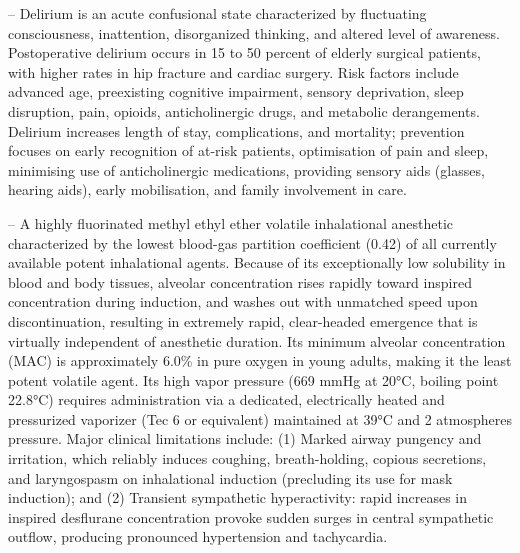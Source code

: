 -- Delirium is an acute confusional state characterized by fluctuating consciousness, inattention, disorganized thinking, and altered level of awareness. Postoperative delirium occurs in 15 to 50 percent of elderly surgical patients, with higher rates in hip fracture and cardiac surgery. Risk factors include advanced age, preexisting cognitive impairment, sensory deprivation, sleep disruption, pain, opioids, anticholinergic drugs, and metabolic derangements. Delirium increases length of stay, complications, and mortality; prevention focuses on early recognition of at-risk patients, optimisation of pain and sleep, minimising use of anticholinergic medications, providing sensory aids (glasses, hearing aids), early mobilisation, and family involvement in care.

-- A highly fluorinated methyl ethyl ether volatile inhalational anesthetic characterized by the lowest blood-gas partition coefficient (0.42) of all currently available potent inhalational agents. Because of its exceptionally low solubility in blood and body tissues, alveolar concentration rises rapidly toward inspired concentration during induction, and washes out with unmatched speed upon discontinuation, resulting in extremely rapid, clear-headed emergence that is virtually independent of anesthetic duration. Its minimum alveolar concentration (MAC) is approximately 6.0\% in pure oxygen in young adults, making it the least potent volatile agent. Its high vapor pressure (669 mmHg at 20°C, boiling point 22.8°C) requires administration via a dedicated, electrically heated and pressurized vaporizer (Tec 6 or equivalent) maintained at 39°C and 2 atmospheres pressure. Major clinical limitations include: (1) Marked airway pungency and irritation, which reliably induces coughing, breath-holding, copious secretions, and laryngospasm on inhalational induction (precluding its use for mask induction); and (2) Transient sympathetic hyperactivity: rapid increases in inspired desflurane concentration provoke sudden surges in central sympathetic outflow, producing pronounced hypertension and tachycardia.

